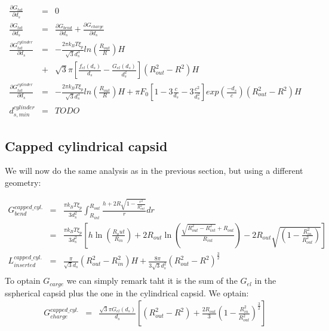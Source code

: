 \documentclass{article}
\begin{document}
\begin{eqnarray}
    \frac{\partial G_{tot}}{\partial d_s} & = & 0 \\
    \frac{\partial G_{tot}}{\partial d_s} & = & \frac{\partial G_{bend}}{\partial d_s} + \frac{\partial G_{charge}}{\partial d_s} \\
    \frac{\partial G_{tot}^{cylinder}}{\partial d_s} & = & - \frac{2 \pi k_B T \xi_p}{\sqrt{3}d_s^3}  ln \left( \frac{R_{out}}{R} \right) H \\
    & + & \sqrt{3} \pi \left[ \frac{f_{el}(d_s)}{d_s} - \frac{G_{el}(d_s)}{d_s^2} \right] \left( R_{out}^2 - R^2 \right) H \\
    \frac{\partial G_{tot}^{cylinder}}{\partial d_s} & = & - \frac{2 \pi k_B T \xi_p}{\sqrt{3}d_s^3}  ln \left( \frac{R_{out}}{R} \right) H + \pi F_0 \left[  1 - 3 \frac{ c  }{d_s} - 3\frac{ c^2 }{d_s^2} \right] exp \left(\frac{-d_s}{c}\right) \left( R_{out}^2 - R^2 \right) H \\
    d_{s,min}^{cylinder} & = & TODO
\end{eqnarray}

\subsection{Capped cylindrical capsid}

We will now do the same analysis as in the previous section, but using a different geometry:


\begin{eqnarray}
    G_{bend}^{capped\_cyl.} & = & \frac{\pi k_B T \xi_p}{3 d_s^2} \int_{R_{int}}^{R_{out}} \frac{h + 2 R \sqrt{1 - \frac{r^2}{R_{out}^2}}}{r} dr \\
    & = & \frac{\pi k_B T \xi_p}{3 d_s^2} \left[ h \ln \left( \frac{R_out}{R_{in}} \right)  + 2R_{out} \ln \left( \frac{\sqrt{R_{out}^2 - R_{int}^2} + R_{out}}{R_{int}} \right) - 2 R_{out} \sqrt{\left( 1 - \frac{R_{in}^2}{R_{out}^2} \right)} \right] \\
    L_{inserted}^{capped\_cyl.} & = & \frac{\pi }{\sqrt{3}d_s} \left( R_{out}^2 - R_{in}^2 \right) H + \frac{8\pi}{3\sqrt{3}d_s^2}(R_{out}^2 - R^2)^\frac{3}{2} \\
\end{eqnarray}
To optain $G_{carge}$ we can simply remark taht it is the sum of the $G_{el}$ in the sspherical capsid plus the one in the cylindrical capsid. We optain:
\begin{eqnarray}    
    G_{charge}^{capped\_cyl.} & = & \frac{\sqrt{3} \pi G_{el}(d_s)}{d_s} \left[ \left( R_{out}^2 - R^2 \right) + \frac{2R_{out}}{3} \left( 1 - \frac{R_{in}^2}{R_{out}^2} \right)^{\frac{3}{2}} \right]
\end{eqnarray}
\end{document}

